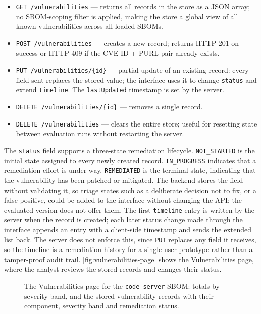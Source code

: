 \begin{itemize}
    \item \texttt{GET /vulnerabilities} --- returns all records in the store as a JSON array; no SBOM-scoping filter is applied, making the store a global view of all known vulnerabilities across all loaded SBOMs.
    \item \texttt{POST /vulnerabilities} --- creates a new record; returns HTTP 201 on success or HTTP 409 if the CVE ID + PURL pair already exists.
    \item \texttt{PUT /vulnerabilities/\{id\}} --- partial update of an existing record: every field sent replaces the stored value; the interface uses it to change \texttt{status} and extend \texttt{timeline}. The \texttt{lastUpdated} timestamp is set by the server.
    \item \texttt{DELETE /vulnerabilities/\{id\}} --- removes a single record.
    \item \texttt{DELETE /vulnerabilities} --- clears the entire store; useful for resetting state between evaluation runs without restarting the server.
\end{itemize}

The \texttt{status} field supports a three-state remediation lifecycle. \texttt{NOT\_STARTED} is the initial state assigned to every newly created record. \texttt{IN\_PROGRESS} indicates that a remediation effort is under way. \texttt{REMEDIATED} is the terminal state, indicating that the vulnerability has been patched or mitigated. The backend stores the field without validating it, so triage states such as a deliberate decision not to fix, or a false positive, could be added to the interface without changing the API; the evaluated version does not offer them. The first \texttt{timeline} entry is written by the server when the record is created; each later status change made through the interface appends an entry with a client-side timestamp and sends the extended list back. The server does not enforce this, since \texttt{PUT} replaces any field it receives, so the timeline is a remediation history for a single-user prototype rather than a tamper-proof audit trail. \autoref{fig:vulnerabilities-page} shows the Vulnerabilities page, where the analyst reviews the stored records and changes their status.

\begin{figure}[!htpb]
    \centering
    \caption[The Vulnerabilities page]{The Vulnerabilities page for the \texttt{code-server} SBOM: totals by severity band, and the stored vulnerability records with their component, severity band and remediation status.}
    \label{fig:vulnerabilities-page}
\end{figure}


